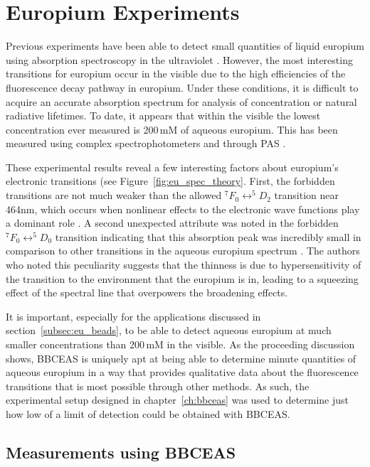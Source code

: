 \chapter{Europium Experiments}\label{ch:eu_exp}

Previous experiments have been able to detect small quantities of liquid
europium using absorption spectroscopy in the ultraviolet \cite{Yun:2001wc}.
However, the most interesting transitions for europium occur in the visible due
to the high efficiencies of the fluorescence decay pathway in europium. Under
these conditions, it is difficult to acquire an accurate absorption spectrum
for analysis of concentration or natural radiative lifetimes. To date, it
appears that within the visible the lowest concentration ever measured is
200\,mM of aqueous europium. This has been measured using complex
spectrophotometers and through \ac{PAS} \cite{Sawada:1979vca}.

These experimental results reveal a few interesting factors about
europium's electronic transitions (see Figure~\ref{fig:eu_spec_theory}.
First, the forbidden transitions are not much weaker than the allowed
$^7F_0 \leftrightarrow ^5D_2$ transition near 464nm, which occurs when
nonlinear effects to the electronic wave functions play a dominant role
\cite{Walsh:2005te}. A second unexpected attribute was noted in the forbidden
$^7F_0 \leftrightarrow ^5D_0$ transition indicating that this absorption
peak was incredibly small in comparison to other transitions in the aqueous
europium spectrum \cite{Sawada:1979vca}. The authors who noted this
peculiarity suggests that the thinness is due to hypersensitivity of the
transition to the environment that the europium is in, leading to a squeezing
effect of the spectral line that overpowers the broadening effects.

It is important, especially for the applications discussed in
section~\ref{subsec:eu_beads}, to be able to detect aqueous europium at
much smaller concentrations than 200\,mM in the visible. As the proceeding
discussion shows, \ac{BBCEAS} is uniquely apt at being able to determine
minute quantities of aqueous europium in a way that provides qualitative
data about the fluorescence transitions that is most possible through other
methods. As such, the experimental setup designed in chapter~\ref{ch:bbceas}
was used to determine just how low of a limit of detection could be obtained
with \ac{BBCEAS}.



\section{Measurements using BBCEAS}\label{sec:eu_measurements}

